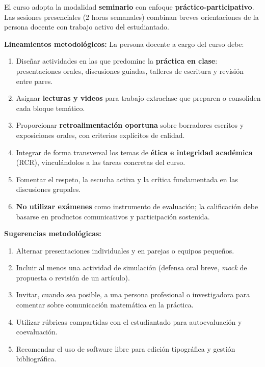 \begin{refsection}
El curso adopta la modalidad \textbf{seminario} con enfoque \textbf{práctico-participativo}. Las sesiones presenciales (2 horas semanales) combinan breves orientaciones de la persona docente con trabajo activo del estudiantado.

\noindent\textbf{Lineamientos metodológicos:} La persona docente a cargo del curso debe:

\begin{enumerate}
    \item Diseñar actividades en las que predomine la \textbf{práctica en clase}: presentaciones orales, discusiones guiadas, talleres de escritura y revisión entre pares.
    \item Asignar \textbf{lecturas y videos} para trabajo extraclase que preparen o consoliden cada bloque temático.
    \item Proporcionar \textbf{retroalimentación oportuna} sobre borradores escritos y exposiciones orales, con criterios explícitos de calidad.
    \item Integrar de forma transversal los temas de \textbf{ética e integridad académica} (RCR), vinculándolos a las tareas concretas del curso.
    \item Fomentar el respeto, la escucha activa y la crítica fundamentada en las discusiones grupales.
    \item \textbf{No utilizar exámenes} como instrumento de evaluación; la calificación debe basarse en productos comunicativos y participación sostenida.
\end{enumerate}

\textbf{Sugerencias metodológicas:}

\begin{enumerate}
    \item Alternar presentaciones individuales y en parejas o equipos pequeños.
    \item Incluir al menos una actividad de simulación (defensa oral breve, \emph{mock} de propuesta o revisión de un artículo).
    \item Invitar, cuando sea posible, a una persona profesional o investigadora para comentar sobre comunicación matemática en la práctica.
    \item Utilizar rúbricas compartidas con el estudiantado para autoevaluación y coevaluación.
    \item Recomendar el uso de software libre para edición tipográfica y gestión bibliográfica.
\end{enumerate}


\end{refsection}
